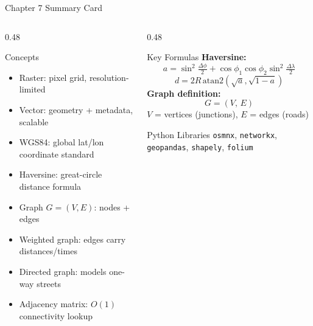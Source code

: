 \documentclass[aspectratio=169,10pt]{beamer}
\begin{document}
\begin{frame}{Chapter 7 Summary Card}
  \begin{columns}[t]
    \begin{column}{0.48\textwidth}
      \begin{block}{Concepts}
        \begin{itemize}
          \item Raster: pixel grid, resolution-limited
          \item Vector: geometry + metadata, scalable
          \item WGS84: global lat/lon coordinate standard
          \item Haversine: great-circle distance formula
          \item Graph $G=(V,E)$: nodes + edges
          \item Weighted graph: edges carry distances/times
          \item Directed graph: models one-way streets
          \item Adjacency matrix: $O(1)$ connectivity lookup
        \end{itemize}
      \end{block}
    \end{column}
    \begin{column}{0.48\textwidth}
      \begin{block}{Key Formulas}
        \textbf{Haversine:}
        \[
          a = \sin^2\!\tfrac{\Delta\phi}{2} +
              \cos\phi_1 \cos\phi_2 \sin^2\!\tfrac{\Delta\lambda}{2}
        \]
        \[
          d = 2R\,\mathrm{atan2}\!\left(\sqrt{a},\sqrt{1-a}\right)
        \]
        \textbf{Graph definition:}
        \[
          G = (V,\, E)
        \]
        $V$ = vertices (junctions), $E$ = edges (roads)
      \end{block}
      \begin{block}{Python Libraries}
        \texttt{osmnx}, \texttt{networkx}, \texttt{geopandas},
        \texttt{shapely}, \texttt{folium}
      \end{block}
    \end{column}
  \end{columns}
\end{frame}

\end{document}
